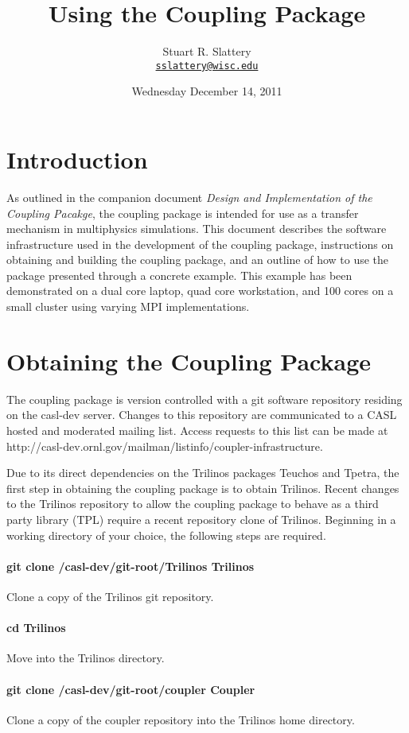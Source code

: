 \documentclass[letterpaper]{article}
\author{Stuart R. Slattery
\\ \href{mailto:sslattery@wisc.edu}{\texttt{sslattery@wisc.edu}}
}
\date{Wednesday December 14, 2011}
\title{Using the Coupling Package}
\begin{document}
\maketitle

\section{Introduction}
As outlined in the companion document {\sl Design and Implementation of
the Coupling Pacakge}, the coupling package is intended for use as a
transfer mechanism in multiphysics simulations. This document
describes the software infrastructure used in the development of the
coupling package, instructions on obtaining and building the coupling
package, and an outline of how to use the package presented through a
concrete example. This example has been demonstrated on a dual core laptop,
quad core workstation, and 100 cores on a small cluster using varying
MPI implementations.

\section{Obtaining the Coupling Package}
The coupling package is version controlled with a git software
repository residing on the casl-dev server. Changes to this repository
are communicated to a CASL hosted and moderated mailing list. Access
requests to this list can be made at
http://casl-dev.ornl.gov/mailman/listinfo/coupler-infrastructure.

Due to its direct dependencies on the Trilinos packages Teuchos and
Tpetra, the first step in obtaining the coupling package is to obtain
Trilinos. Recent changes to the Trilinos repository to allow the
coupling package to behave as a third party library (TPL) require a
recent repository clone of Trilinos. Beginning in a working directory
of your choice, the following steps are required.

\paragraph{git clone /casl-dev/git-root/Trilinos Trilinos}
Clone a copy of the Trilinos git repository.

\paragraph{cd Trilinos}
Move into the Trilinos directory.

\paragraph{git clone /casl-dev/git-root/coupler Coupler} 
Clone a copy of the coupler repository into the Trilinos home
directory.
\end{document}
